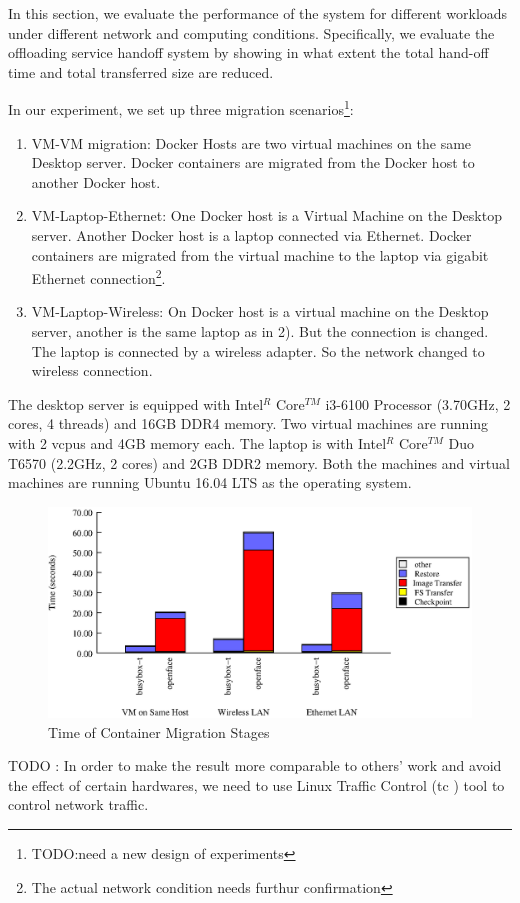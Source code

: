
In this section, we evaluate the performance of the system for different workloads under different network and computing conditions. Specifically, we evaluate the offloading service handoff system by showing in what extent the total hand-off time and total transferred size are reduced.

In our experiment, we set up three migration scenarios\footnote{TODO:need a new design of experiments}: 
\begin{enumerate}
    \item VM-VM migration:
    Docker Hosts are two virtual machines on the same Desktop server. Docker containers are migrated from the Docker host to another Docker host.
    \item VM-Laptop-Ethernet: 
    One Docker host is a Virtual Machine on the Desktop server. Another Docker host  is a laptop connected via Ethernet. Docker containers are migrated from the virtual machine to the laptop via gigabit Ethernet connection\footnote{The actual network condition needs furthur confirmation}.
    \item VM-Laptop-Wireless:
    On Docker host is a virtual machine on the Desktop server, another is the same laptop as in 2). But the connection is changed. The laptop is connected by a wireless adapter. So the network changed to wireless connection.
\end{enumerate}

The desktop server is equipped with Intel$^{R}$ Core$^{TM}$ i3-6100 Processor (3.70GHz, 2 cores, 4 threads) and 16GB DDR4 memory. Two virtual machines are running with 2 vcpus and 4GB memory each.
The laptop is with Intel$^{R}$ Core$^{TM}$ Duo T6570 (2.2GHz, 2 cores) and 2GB DDR2 memory. Both the machines and virtual machines are running Ubuntu 16.04 LTS as the operating system.





\begin{figure}[tb!]
    \centering
    \includegraphics[width=\textwidth]{figure/test-tarssh.eps}
    \caption{Time of Container Migration Stages}
    \label{fig:timestage}
\end{figure}


TODO :
In order to make the result more comparable to others' work and avoid the effect of certain hardwares, we need to use Linux Traffic Control (tc\cite{tc} )  tool to control network traffic.
